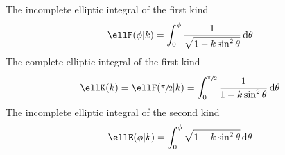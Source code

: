 The incomplete elliptic integral of the first kind
\begin{equation}\label{eq:incomplete_elliptic_integral_first}
  \ellF(\phi \vert k) = \int_{0}^{\phi} \frac{1}{\sqrt{1 - k \sin^2{\theta}}}\,\dee\theta
\end{equation}
The complete elliptic integral of the first kind
\begin{equation}\label{eq:complete_elliptic_integral_first}
  \ellK(k) = \ellF(\sfrac{\pi}{2} \vert k) = \int_{0}^{\sfrac{\pi}{2}} \frac{1}{1 - k\sin^2{\theta}} \,\dee\theta
\end{equation}
The incomplete elliptic integral of the second kind
\begin{equation}\label{eq:incomplete_elliptic_integral_second}
  \ellE(\phi \vert k) = \int_{0}^{\phi} \sqrt{1 - k \sin^2{\theta}}\,\dee\theta
\end{equation}
